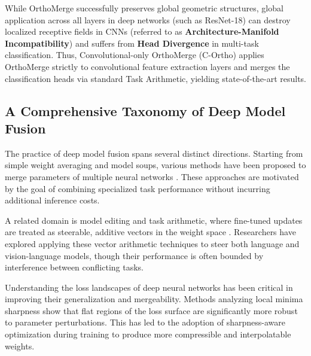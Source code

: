 \documentclass{article}
\theoremstyle{plain}
\theoremstyle{definition}
\theoremstyle{remark}
\begin{document}
While OrthoMerge successfully preserves global geometric structures, global application across all layers in deep networks (such as ResNet-18) can destroy localized receptive fields in CNNs (referred to as \textbf{Architecture-Manifold Incompatibility}) and suffers from \textbf{Head Divergence} in multi-task classification. Thus, Convolutional-only OrthoMerge (C-Ortho) applies OrthoMerge strictly to convolutional feature extraction layers and merges the classification heads via standard Task Arithmetic, yielding state-of-the-art results.

\subsection{A Comprehensive Taxonomy of Deep Model Fusion}

The practice of deep model fusion spans several distinct directions. Starting from simple weight averaging and model soups, various methods have been proposed to merge parameters of multiple neural networks \cite{lu2024hybrid,horoi2024harmony,panariello2025accurate,qiu2025superpose,crisostomi2024c2m3,zheng2024freemerging,khan2024finding,chou2018unifying,li2017credit,chou2018merging,gu2023hierarchical,smith2017investigation,cao2024deep,asif2024cgoensemble,rame2022diverse}. These approaches are motivated by the goal of combining specialized task performance without incurring additional inference costs.

A related domain is model editing and task arithmetic, where fine-tuned updates are treated as steerable, additive vectors in the weight space \cite{bhardwaj2024language,yoshida2025mastering,dai2025leveraging,braga2025investigating,naganuma2025fairness,rittergutierrez2025distilling,ortizjimenez2023task,singal2025task,jin2024finetuning,su2024task,shirafuji2024bias,gu2024model}. Researchers have explored applying these vector arithmetic techniques to steer both language and vision-language models, though their performance is often bounded by interference between conflicting tasks.

Understanding the loss landscapes of deep neural networks has been critical in improving their generalization and mergeability. Methods analyzing local minima sharpness \cite{foret2020sharpnessaware,fan2025towards,kwon2021asam,andriushchenko2022towards,qu2022generalized,luo2025explicit,li2024friendly,ilbert2024samformer,zhu2023enhancing,li2025focalsam,oikonomou2025sharpnessaware,liu2022towards} show that flat regions of the loss surface are significantly more robust to parameter perturbations. This has led to the adoption of sharpness-aware optimization during training to produce more compressible and interpolatable weights.
\end{document}
